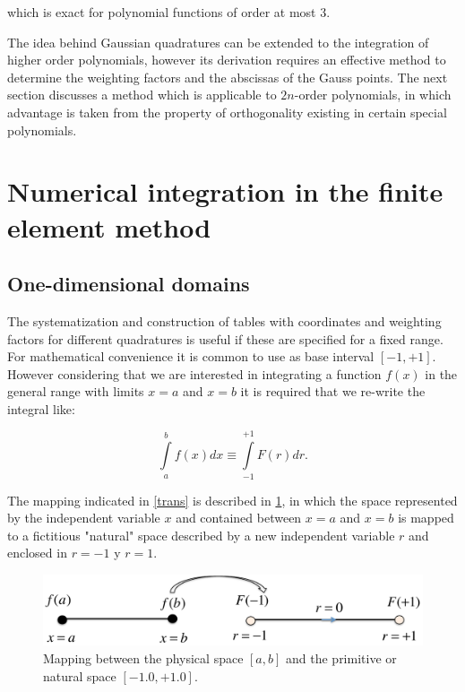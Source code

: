 which is exact for polynomial functions of order at most 3.

The idea behind Gaussian quadratures can be extended to the integration of higher order polynomials, however its derivation requires an effective method to determine the weighting factors and the abscissas of the Gauss points. The next section discusses a method which is applicable to $2n$-order polynomials, in which advantage is taken from the property of orthogonality existing in certain special polynomials.




\section{Numerical integration in the finite element method}
\label{isopar}

\subsection{One-dimensional domains}
The systematization and construction of tables with coordinates and weighting factors for different quadratures is  useful if these are specified for a fixed range. For mathematical convenience it is common to use as base interval $[-1,+1]$. However considering that we are interested in integrating a function $f(x)$ in the general range with limits $x=a$ and $x=b$ it is required that we re-write the integral like:

\begin{equation}
\int\limits_a^b {f(x)dx \equiv } \int\limits_{ - 1}^{ + 1} {F(r)dr}. 
\label{trans}
\end{equation}

The mapping indicated in \cref{trans} is described in \cref{fig:map}, in which the space represented by the independent variable $x$ and contained between $x=a$ and $x=b$ is mapped to a fictitious "natural" space described by a new independent variable $r$ and enclosed in $r=-1$ y $r=1$.


\begin{figure}[H]
\centering
\includegraphics[width=12cm]{img/mapping.pdf}
\caption{Mapping between the physical space $[a,b]$ and the primitive or natural space $[-1.0,+1.0].$}
\label{fig:map}
\end{figure}

